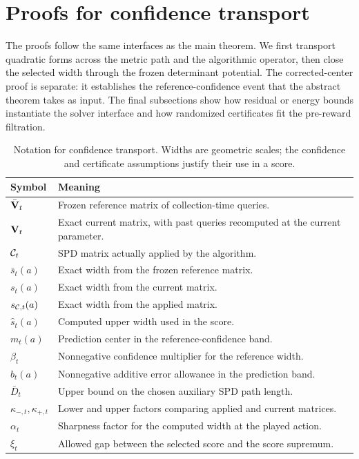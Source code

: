 \section{Proofs for confidence transport}
\label{app:transport-proofs}

The proofs follow the same interfaces as the main theorem.  We first transport
quadratic forms across the metric path and the algorithmic operator, then close
the selected width through the frozen determinant potential.  The
corrected-center proof is separate: it establishes the reference-confidence
event that the abstract theorem takes as input.  The final subsections show how
residual or energy bounds instantiate the solver interface and how randomized
certificates fit the pre-reward filtration.

\begin{table}[H]
\caption{Notation for confidence transport.  Widths are geometric scales;
the confidence and certificate assumptions justify their use in a score.}
\label{tab:transport-notation}
\centering
\begin{tabularx}{\columnwidth}{@{}p{}X@{}}
\toprule
Symbol & Meaning \\
\midrule
$\bar{\mathbf{V}}_t$ & Frozen reference matrix of collection-time queries. \\
$\mathbf{V}_t$ & Exact current matrix, with past queries recomputed at the current parameter. \\
$\mathcal{C}_t$ & SPD matrix actually applied by the algorithm. \\
\midrule
$\bar s_t(a)$ & Exact width from the frozen reference matrix. \\
$s_t(a)$ & Exact width from the current matrix. \\
$s_{\mathcal{C},t}(a)$ & Exact width from the applied matrix. \\
$\hat s_t(a)$ & Computed upper width used in the score. \\
\midrule
$m_t(a)$ & Prediction center in the reference-confidence band. \\
$\beta_t$ & Nonnegative confidence multiplier for the reference width. \\
$b_t(a)$ & Nonnegative additive error allowance in the prediction band. \\
$\bar D_t$ & Upper bound on the chosen auxiliary SPD path length. \\
$\kappa_{-,t},\kappa_{+,t}$ & Lower and upper factors comparing applied and current matrices. \\
$\alpha_t$ & Sharpness factor for the computed width at the played action. \\
$\xi_t$ & Allowed gap between the selected score and the score supremum. \\
\bottomrule
\end{tabularx}
\end{table}

